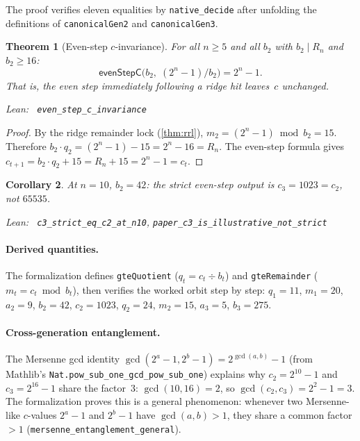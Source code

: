 \documentclass[11pt,a4paper]{article}
\newenvironment{leanref}%
  {\par\smallskip\noindent\begingroup\raggedright\textup{Lean:}~}%
  {\par\endgroup}
\newtheorem{theorem}{Theorem}[section]
\newtheorem{corollary}[theorem]{Corollary}
\theoremstyle{definition}
\newcommand{\Rn}{R_n}
\begin{document}
The proof verifies eleven equalities by \texttt{native\_decide} after
unfolding the definitions of \texttt{canonicalGen2} and
\texttt{canonicalGen3}.

\begin{theorem}[Even-step $c$-invariance]\label{thm:c-inv}
For all $n \ge 5$ and all $b_2$ with $b_2 \mid \Rn$ and $b_2 \ge 16$:
\[
  \mathsf{evenStepC}\bigl(b_2,\; (2^n - 1) / b_2\bigr) = 2^n - 1.
\]
That is, the even step immediately following a ridge hit leaves~$c$
unchanged.

\begin{leanref} \lstinline|even_step_c_invariance|
\end{leanref}
\end{theorem}

\begin{proof}
By the ridge remainder lock (\cref{thm:rrl}), $m_2 = (2^n - 1) \bmod
b_2 = 15$.  Therefore $b_2 \cdot q_2 = (2^n - 1) - 15 = 2^n - 16 =
\Rn$.  The even-step formula gives $c_{t+1} = b_2 \cdot q_2 + 15 =
\Rn + 15 = 2^n - 1 = c_t$.
\end{proof}

\begin{corollary}\label{cor:c3-strict}
At $n = 10$, $b_2 = 42$: the strict even-step output is
$c_3 = 1023 = c_2$, not $65535$.

\begin{leanref} \lstinline|c3_strict_eq_c2_at_n10|,
\lstinline|paper_c3_is_illustrative_not_strict|
\end{leanref}
\end{corollary}

\paragraph{Derived quantities.}
The formalization defines \texttt{gteQuotient} ($q_t = c_t \div b_t$)
and \texttt{gteRemainder} ($m_t = c_t \bmod b_t$), then verifies the
worked orbit step by step:
$q_1 = 11$, $m_1 = 20$, $a_2 = 9$, $b_2 = 42$, $c_2 = 1023$,
$q_2 = 24$, $m_2 = 15$, $a_3 = 5$, $b_3 = 275$.

\paragraph{Cross-generation entanglement.}
The Mersenne gcd identity $\gcd(2^a - 1, 2^b - 1) = 2^{\gcd(a,b)} - 1$
(from Mathlib's \texttt{Nat.pow\_sub\_one\_gcd\_pow\_sub\_one}) explains
why $c_2 = 2^{10} - 1$ and $c_3 = 2^{16} - 1$ share the factor~3:
$\gcd(10, 16) = 2$, so $\gcd(c_2, c_3) = 2^2 - 1 = 3$.  The
formalization proves this is a general phenomenon: whenever two
Mersenne-like $c$-values $2^a - 1$ and $2^b - 1$ have $\gcd(a, b) > 1$,
they share a common factor $> 1$
(\texttt{mersenne\_entanglement\_general}).
\end{document}
